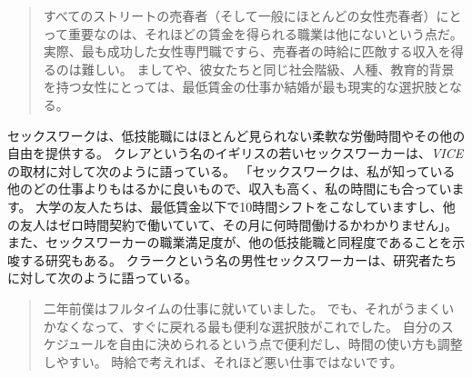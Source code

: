 \documentclass[paper=a4,book,openany]{jlreq}
\newcommand{\ig}[1]{}           %
\begin{document}
\begin{quote}
すべてのストリートの売春者（そして一般にほとんどの女性売春者）にとって重要なのは、それほどの賃金を得られる職業は他にないという点だ。
実際、最も成功した女性専門職ですら、売春者の時給に匹敵する収入を得るのは難しい。
ましてや、彼女たちと同じ社会階級、人種、教育的背景を持つ女性にとっては、最低賃金の仕事か結婚が最も現実的な選択肢となる。
\citep[p.104]{bernstein99:_whats_wrong_prost}\ig{Elizabeth Bernstein}
\end{quote}

セックスワークは、低技能職にはほとんど見られない柔軟な労働時間やその他の自由を提供する。
クレアという名のイギリスの若いセックスワーカーは、\emph{VICE}の取材に対して次のように語っている。
「セックスワークは、私が知っている他のどの仕事よりもはるかに良いもので、収入も高く、私の時間にも合っています。
大学の友人たちは、最低賃金以下で10時間シフトをこなしていますし、他の友人はゼロ時間契約で働いていて、その月に何時間働けるかわかりません」\citep{mcintyre15:_what_its_like_pay_your}。
また、セックスワーカーの職業満足度が、他の低技能職と同程度であることを示唆する研究もある\citep{bilardi11:_job_satis_femal_sex_worker}。
クラークという名の男性セックスワーカーは、研究者たちに対して次のように語っている。

\begin{quote}
二年前僕はフルタイムの仕事に就いていました。
でも、それがうまくいかなくなって、すぐに戻れる最も便利な選択肢がこれでした。
自分のスケジュールを自由に決められるという点で便利だし、時間の使い方も調整しやすい。
時給で考えれば、それほど悪い仕事ではないです。
\citep[p.11]{curtis19:_we_are_naked_waitr_who_deliv_sex}
\end{quote}
\end{document}
